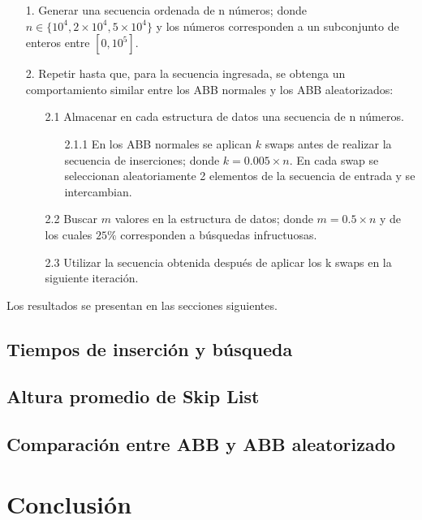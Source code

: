 \documentclass[12pt,letterpaper]{article}
\begin{document}
\begin{itemize}
\item[1.] Generar una secuencia ordenada de n números; donde $n \in \{10^{4}, 2 \times 10^{4} , 5 \times 10^{4}\}$ y los números corresponden a un subconjunto de enteros entre $[0, 10^{5}]$.
\item[2.] Repetir hasta que, para la secuencia ingresada, se obtenga un comportamiento similar entre los ABB normales y los ABB aleatorizados:
	\begin{itemize}
	\item[2.1] Almacenar en cada estructura de datos una secuencia de n números.
		\begin{itemize}
		\item[2.1.1] En los ABB normales se aplican $k$ swaps antes de realizar la secuencia de inserciones; donde $k = 0.005 \times n$. En cada swap se seleccionan aleatoriamente 2 elementos de la secuencia de entrada y se intercambian.
		\end{itemize}
	\item[2.2] Buscar $m$ valores en la estructura de datos; donde $m = 0.5 \times n$ y de los cuales $25\%$ corresponden a búsquedas infructuosas.
	\item[2.3] Utilizar la secuencia obtenida después de aplicar los k swaps en la siguiente iteración.
	\end{itemize}
\end{itemize}

Los resultados se presentan en las secciones siguientes.

\subsection{Tiempos de inserción y búsqueda}



\subsection{Altura promedio de Skip List}
\subsection{Comparación entre ABB y ABB aleatorizado}
\section{Conclusión}


\end{document}
